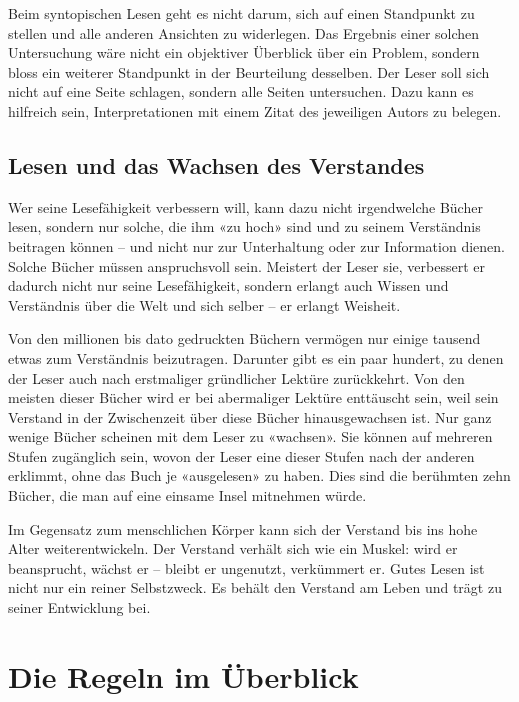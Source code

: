 \documentclass[a4paper,11pt]{scrartcl}
\begin{document}
Beim syntopischen Lesen geht es nicht darum, sich auf einen Standpunkt zu stellen und alle anderen Ansichten zu widerlegen. Das Ergebnis einer solchen Untersuchung wäre nicht ein objektiver Überblick über ein Problem, sondern bloss ein weiterer Standpunkt in der Beurteilung desselben. Der Leser soll sich nicht auf eine Seite schlagen, sondern alle Seiten untersuchen. Dazu kann es hilfreich sein, Interpretationen mit einem Zitat des jeweiligen Autors zu belegen.

\subsection{Lesen und das Wachsen des Verstandes}

Wer seine Lesefähigkeit verbessern will, kann dazu nicht irgendwelche Bücher lesen, sondern nur solche, die ihm «zu hoch» sind und zu seinem Verständnis beitragen können – und nicht nur zur Unterhaltung oder zur Information dienen. Solche Bücher müssen anspruchsvoll sein. Meistert der Leser sie, verbessert er dadurch nicht nur seine Lesefähigkeit, sondern erlangt auch Wissen und Verständnis über die Welt und sich selber – er erlangt Weisheit.

Von den millionen bis dato gedruckten Büchern vermögen nur einige tausend etwas zum Verständnis beizutragen. Darunter gibt es ein paar hundert, zu denen der Leser auch nach erstmaliger gründlicher Lektüre zurückkehrt. Von den meisten dieser Bücher wird er bei abermaliger Lektüre enttäuscht sein, weil sein Verstand in der Zwischenzeit über diese Bücher hinausgewachsen ist. Nur ganz wenige Bücher scheinen mit dem Leser zu «wachsen». Sie können auf mehreren Stufen zugänglich sein, wovon der Leser eine dieser Stufen nach der anderen erklimmt, ohne das Buch je «ausgelesen» zu haben. Dies sind die berühmten zehn Bücher, die man auf eine einsame Insel mitnehmen würde.

Im Gegensatz zum menschlichen Körper kann sich der Verstand bis ins hohe Alter weiterentwickeln. Der Verstand verhält sich wie ein Muskel: wird er beansprucht, wächst er – bleibt er ungenutzt, verkümmert er. Gutes Lesen ist nicht nur ein reiner Selbstzweck. Es behält den Verstand am Leben und trägt zu seiner Entwicklung bei.

\newpage
\section*{Die Regeln im Überblick}
\end{document}
